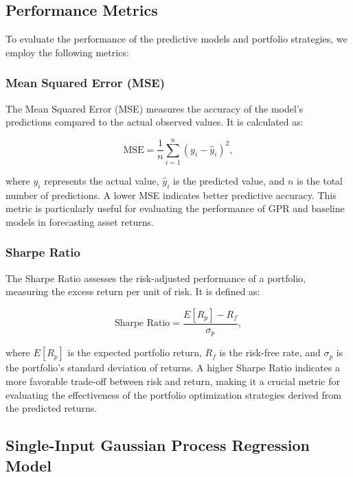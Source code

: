 \subsection{Performance Metrics}

To evaluate the performance of the predictive models and portfolio strategies, we employ the following metrics:

\subsubsection{Mean Squared Error (MSE)}

The Mean Squared Error (MSE) measures the accuracy of the model's predictions compared to the actual observed values. It is calculated as:

\begin{equation}
\text{MSE} = \frac{1}{n} \sum_{i=1}^{n} \left( y_i - \hat{y}_i \right)^2,
\end{equation}

where $y_i$ represents the actual value, $\hat{y}_i$ is the predicted value, and $n$ is the total number of predictions. A lower MSE indicates better predictive accuracy. This metric is particularly useful for evaluating the performance of GPR and baseline models in forecasting asset returns.

\subsubsection{Sharpe Ratio}

The Sharpe Ratio assesses the risk-adjusted performance of a portfolio, measuring the excess return per unit of risk. It is defined as:

\begin{equation}
\text{Sharpe Ratio} = \frac{E[R_p] - R_f}{\sigma_p},
\end{equation}

where $E[R_p]$ is the expected portfolio return, $R_f$ is the risk-free rate, and $\sigma_p$ is the portfolio's standard deviation of returns. A higher Sharpe Ratio indicates a more favorable trade-off between risk and return, making it a crucial metric for evaluating the effectiveness of the portfolio optimization strategies derived from the predicted returns.

\subsection{Single-Input Gaussian Process Regression Model}


